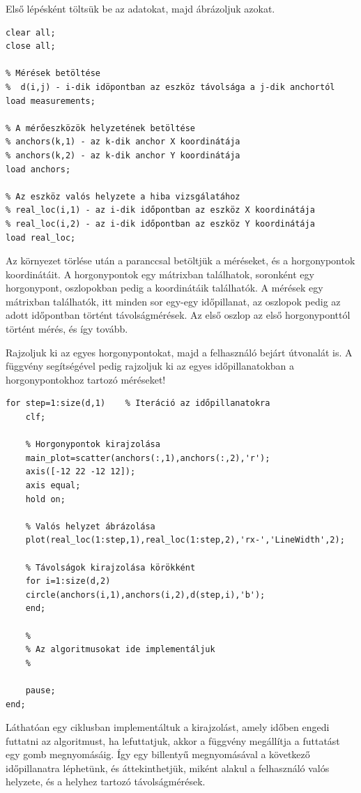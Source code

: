 \begin{answer}
	Első lépésként töltsük be az adatokat, majd ábrázoljuk azokat.
\begin{lstlisting}	
clear all;
close all;

% Mérések betöltése
%  d(i,j) - i-dik idöpontban az eszköz távolsága a j-dik anchortól
load measurements;

% A mérőeszközök helyzetének betöltése
% anchors(k,1) - az k-dik anchor X koordinátája
% anchors(k,2) - az k-dik anchor Y koordinátája
load anchors;

% Az eszköz valós helyzete a hiba vizsgálatához
% real_loc(i,1) - az i-dik időpontban az eszköz X koordinátája
% real_loc(i,2) - az i-dik időpontban az eszköz Y koordinátája
load real_loc;
\end{lstlisting}
	Az környezet törlése után a  paranccsal betöltjük a méréseket, és a horgonypontok koordinátáit. A horgonypontok egy  mátrixban találhatok, soronként egy horgonypont, oszlopokban pedig a koordinátáik találhatók. A mérések egy  mátrixban találhatók, itt minden sor egy-egy időpillanat, az oszlopok pedig az adott időpontban történt távolságmérések. Az első oszlop az első horgonyponttól történt mérés, és így tovább.

	Rajzoljuk ki az egyes horgonypontokat, majd a felhasználó bejárt útvonalát is. A  függvény segítségével pedig rajzoljuk ki az egyes időpillanatokban a horgonypontokhoz tartozó méréseket!
\begin{lstlisting}
for step=1:size(d,1)	% Iteráció az időpillanatokra
	clf;
	
	% Horgonypontok kirajzolása
	main_plot=scatter(anchors(:,1),anchors(:,2),'r');
	axis([-12 22 -12 12]);
	axis equal;
	hold on;
	
	% Valós helyzet ábrázolása
	plot(real_loc(1:step,1),real_loc(1:step,2),'rx-','LineWidth',2);
	
	% Távolságok kirajzolása körökként
	for i=1:size(d,2)
	circle(anchors(i,1),anchors(i,2),d(step,i),'b');
	end;
	
	%
	% Az algoritmusokat ide implementáljuk
	%
	
	pause;
end;
\end{lstlisting}
	Láthatóan egy  ciklusban implementáltuk a kirajzolást, amely időben engedi futtatni az algoritmust, ha lefuttatjuk, akkor a  függvény megállítja a futtatást egy gomb megnyomásáig. Így egy billentyű megnyomásával a következő időpillanatra léphetünk, és áttekinthetjük, miként alakul a felhasználó valós helyzete, és a helyhez tartozó távolságmérések.
	

\end{answer}
